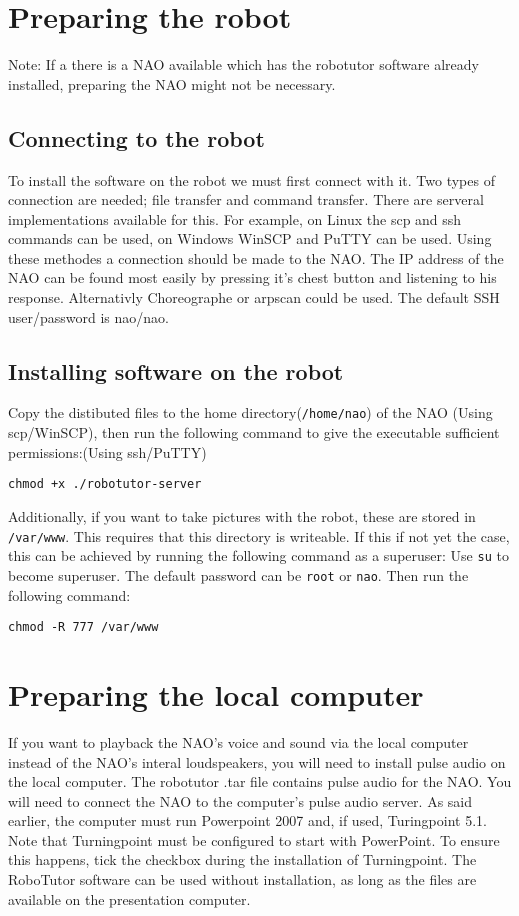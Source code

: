 
\section{Preparing the robot}
Note: If a there is a NAO available which has the robotutor software already installed, preparing the NAO might not be necessary.

\subsection{Connecting to the robot}
To install the software on the robot we must first connect with it. Two types of connection are needed; file transfer and command transfer. There are serveral implementations available for this. For example, on Linux the scp and ssh commands can be used, on Windows WinSCP and PuTTY can be used. Using these methodes a connection should be made to the NAO. The IP address of the NAO can be found most easily by pressing it's chest button and listening to his response. Alternativly Choreographe or arpscan could be used. The default SSH user/password is nao/nao. 

\subsection{Installing software on the robot}

Copy the distibuted files to the home directory(\texttt{/home/nao}) of the NAO (Using scp/WinSCP), then run the following command to give the executable sufficient permissions:(Using ssh/PuTTY)
\begin{verbatim}
chmod +x ./robotutor-server
\end{verbatim}
Additionally, if you want to take pictures with the robot, these are stored in \texttt{/var/www}. This requires that this directory is writeable. If this if not yet the case, this can be achieved by running the following command as a superuser:
Use \texttt{su} to become superuser. The default password can be \texttt{root} or \texttt{nao}. Then run the following command:
\begin{verbatim}
chmod -R 777 /var/www 
\end{verbatim}


\section{Preparing the local computer}
If you want to playback the NAO's voice and sound via the local computer instead of the NAO's interal loudspeakers, you will need to install pulse audio on the local computer. The robotutor .tar file contains pulse audio for the NAO. You will need to connect the NAO to the computer's pulse audio server. As said earlier, the computer must run Powerpoint 2007 and, if used, Turingpoint 5.1. Note that Turningpoint must be configured to start with PowerPoint. To ensure this happens, tick the checkbox during the installation of Turningpoint. The RoboTutor software can be used without installation, as long as the files are available on the presentation computer.

